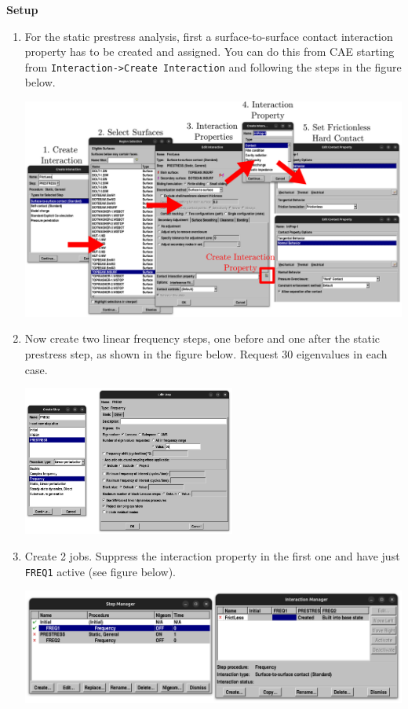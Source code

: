\documentclass[11pt]{article}
\begin{document}
\textbf{Setup}
\begin{enumerate}
\item For the static prestress analysis, first a surface-to-surface contact interaction property has to be created and assigned.
You can do this from CAE starting from \texttt{Interaction->Create Interaction} and following the steps in the figure below.
\begin{center}
\includegraphics[width=.9\linewidth]{./figs/setcontact.png}
\end{center}
\item Now create two linear frequency steps, one before and one after the static prestress step, as shown in the figure below.
Request 30 eigenvalues in each case.
\begin{center}
\includegraphics[width=0.55\textwidth]{./figs/lfreq.png}
\end{center}
\item Create 2 jobs. Suppress the interaction property in the first one and have just \texttt{FREQ1} active (see figure below).
\begin{center}
\includegraphics[width=.9\linewidth]{./figs/run1.png}

\end{center}
\end{enumerate}
\end{document}
